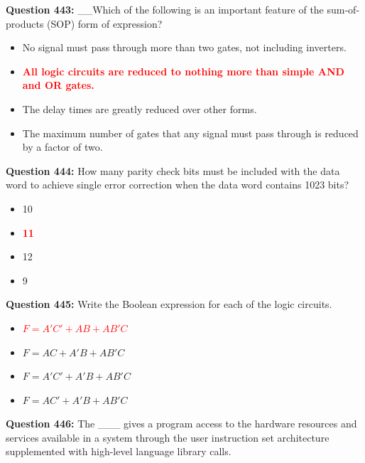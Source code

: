 \documentclass[12pt,a4paper]{article}
\begin{document}
\vspace{0.5cm}

\textbf{Question 443:} __Which of the following is an important feature of the sum-of-products (SOP) form of expression?

\begin{itemize}
    \item[\textbf{A.}] No signal must pass through more than two gates, not including inverters.
    \item[\textbf{B.}] \textcolor{red}{\textbf{All logic circuits are reduced to nothing more than simple AND and OR gates.}}
    \item[\textbf{C.}] The delay times are greatly reduced over other forms.
    \item[\textbf{D.}] The maximum number of gates that any signal must pass through is reduced by a factor of two.
\end{itemize}

\vspace{0.5cm}

\textbf{Question 444:} How many parity check bits must be included with the data word to achieve single error correction when the data word contains 1023 bits?

\begin{itemize}
    \item[\textbf{A.}] 10
    \item[\textbf{B.}] \textcolor{red}{\textbf{11}}
    \item[\textbf{C.}] 12
    \item[\textbf{D.}] 9
\end{itemize}

\vspace{0.5cm}

\textbf{Question 445:} Write the Boolean expression for each of the logic circuits.

\begin{itemize}
    \item[\textbf{A.}] \textcolor{red}{\textbf{$F = A'C' + AB + AB'C$}}
    \item[\textbf{B.}] $F = AC + A'B + AB'C$
    \item[\textbf{C.}] $F = A'C' + A'B + AB'C$
    \item[\textbf{D.}] $F = AC' + A'B + AB'C$
\end{itemize}

\vspace{0.5cm}

\textbf{Question 446:} The ___ gives a program access to the hardware resources and services available in a system through the user instruction set architecture supplemented with high-level language library calls.
\end{document}

